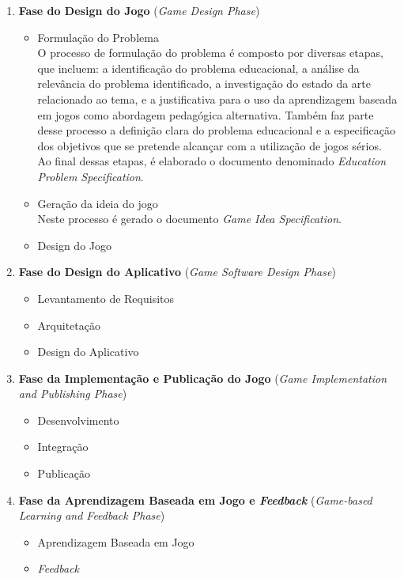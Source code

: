 \begin{enumerate}
  \item \textbf{Fase do Design do Jogo} (\emph{Game Design Phase})
  \begin{itemize}
    \item Formulação do Problema \\
      O processo de formulação do problema é composto por diversas etapas, que
      incluem: a identificação do problema educacional, a análise da relevância do
      problema identificado, a investigação do estado da arte relacionado ao tema, e
      a justificativa para o uso da aprendizagem baseada em jogos como abordagem
      pedagógica alternativa. Também faz parte desse processo a definição clara do
      problema educacional e a especificação dos objetivos que se pretende alcançar
      com a utilização de jogos sérios. Ao final dessas etapas, é elaborado o
      documento denominado \emph{Education Problem Specification}.
    \item Geração da ideia do jogo \\
      Neste processo é gerado o documento \emph{Game Idea Specification}.
    \item Design do Jogo
  \end{itemize}
  \item \textbf{Fase do Design do Aplicativo} (\emph{Game Software Design Phase})
  \begin{itemize}
    \item Levantamento de Requisitos
    \item Arquitetação
    \item Design do Aplicativo
  \end{itemize}
  \item \textbf{Fase da Implementação e Publicação do Jogo} (\emph{Game Implementation and Publishing Phase})
  \begin{itemize}
    \item Desenvolvimento
    \item Integração
    \item Publicação
  \end{itemize}
  \item \textbf{Fase da Aprendizagem Baseada em Jogo e \emph{Feedback}} (\emph{Game-based Learning and Feedback Phase})
  \begin{itemize}
    \item Aprendizagem Baseada em Jogo
    \item \emph{Feedback}
  \end{itemize}
\end{enumerate}

% 
% 
